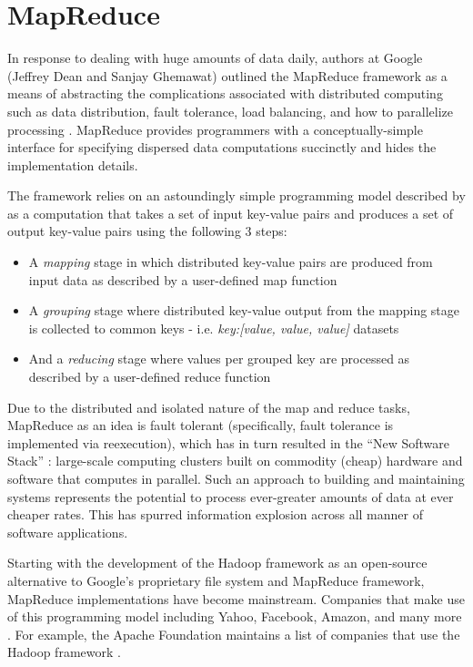 \section{MapReduce}
In response to dealing with huge amounts of data daily, authors at Google (Jeffrey Dean and Sanjay Ghemawat) outlined the MapReduce framework as a means of abstracting the complications associated with distributed computing such as data distribution, fault tolerance, load balancing, and how to parallelize processing \cite{Dean:2008}. MapReduce provides programmers with a conceptually-simple interface for specifying dispersed data computations succinctly and hides the implementation details.

The framework relies on an astoundingly simple programming model described by \cite{Dean:2008} as a computation that takes a set of input key-value pairs and produces a set of output key-value pairs using the following 3 steps:

\begin{itemize}
    \item A \textit{mapping} stage in which distributed key-value pairs are produced from input data as described by a user-defined map function
    \item A \textit{grouping} stage where distributed key-value output from the mapping stage is collected to common keys - i.e. \textit{key:[value, value, value]} datasets
    \item And a \textit{reducing} stage where values per grouped key are processed as described by a user-defined reduce function
\end{itemize}

Due to the distributed and isolated nature of the map and reduce tasks, MapReduce as an idea is fault tolerant (specifically, fault tolerance is implemented via reexecution), which has in turn resulted in the ``New Software Stack'' \cite{mining2011}: large-scale computing clusters built on commodity (cheap) hardware and software that computes in parallel. Such an approach to building and maintaining systems represents the potential to process ever-greater amounts of data at ever cheaper rates. This has spurred information explosion across all manner of software applications.

Starting with the development of the Hadoop framework as an open-source alternative to Google's proprietary file system and MapReduce framework, MapReduce implementations have become mainstream. Companies that make use of this programming model including Yahoo, Facebook, Amazon, and many more \cite{chandar2010}. For example, the Apache Foundation maintains a list of companies that use the Hadoop framework \cite{hadoopPower:2017}.

